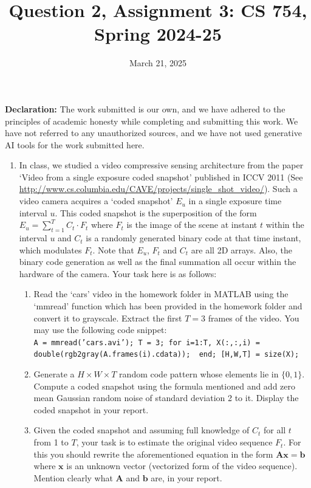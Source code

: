\documentclass{article}
\title{Question 2, Assignment 3: CS 754, Spring 2024-25}
\author{
\IEEEauthorblockN{
    \begin{tabular}{cccc}
        \begin{minipage}[t]{0.23\textwidth}
            \centering
            Amitesh Shekhar\\
            IIT Bombay\\
            22b0014@iitb.ac.in
        \end{minipage} & 
        \begin{minipage}[t]{0.23\textwidth}
            \centering
            Anupam Rawat\\
            IIT Bombay\\
            22b3982@iitb.ac.in
        \end{minipage} & 
        \begin{minipage}[t]{0.23\textwidth}
            \centering
            Toshan Achintya Golla\\
            IIT Bombay\\
            22b2234@iitb.ac.in
        \end{minipage} \\
        \\ 
    \end{tabular}
}
}
\date{March 21, 2025}
\begin{document}
\maketitle

\textbf{Declaration:} The work submitted is our own, and
we have adhered to the principles of academic honesty while completing and submitting this work. We have not
referred to any unauthorized sources, and we have not used generative AI tools for the work submitted here.

\begin{enumerate}
\item In class, we studied a video compressive sensing architecture from the paper `Video from a single exposure coded snapshot' published in ICCV 2011 (See \url{http://www.cs.columbia.edu/CAVE/projects/single_shot_video/}). Such a video camera acquires a `coded snapshot' $E_u$ in a single exposure time interval $u$. This coded snapshot is the superposition of the form $E_u = \sum_{t=1}^T C_t \cdot F_t$ where $F_t$ is the image of the scene at instant $t$ within the interval $u$ and $C_t$ is a randomly generated binary code at that time instant, which modulates $F_t$. Note that $E_u$, $F_t$ and $C_t$ are all 2D arrays. Also, the binary code generation as well as the final summation all occur within the hardware of the camera. Your task here is as follows:
\begin{enumerate}
\item Read the `cars' video in the homework folder in MATLAB using the `mmread' function which has been provided in the homework folder and convert it to grayscale. Extract the first $T = 3$ frames of the video. You may use the following code snippet: \\
\texttt{A = mmread('cars.avi');
T = 3;
for i=1:T,  X(:,:,i) = double(rgb2gray(A.frames(i).cdata)); \ end;
[H,W,T] = size(X);
}
\item Generate a $H \times W \times T$ random code pattern whose elements lie in $\{0,1\}$. Compute a coded snapshot using the formula mentioned and add zero mean Gaussian random noise of standard deviation 2 to it. Display the coded snapshot in your report.
\item Given the coded snapshot and assuming full knowledge of $C_t$ for all $t$ from 1 to $T$, your task is to estimate the original video sequence $F_t$. For this you should rewrite the aforementioned equation in the form $\boldsymbol{Ax} = \boldsymbol{b}$ where $\boldsymbol{x}$ is an unknown vector (vectorized form of the video sequence). Mention clearly what $\boldsymbol{A}$ and $\boldsymbol{b}$ are, in your report.

\end{enumerate}
\end{enumerate}
\end{document}

